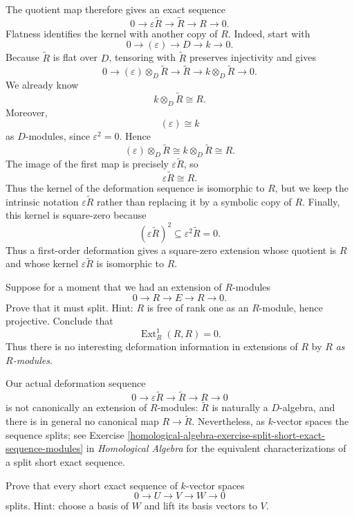 The quotient map therefore gives an exact sequence
$$
0\longrightarrow\varepsilon\widetilde R
\longrightarrow\widetilde R
\longrightarrow R\longrightarrow0.
$$
Flatness identifies the kernel with another copy of $R$. Indeed, start with
$$
0\longrightarrow(\varepsilon)\longrightarrow D
\longrightarrow k\longrightarrow0.
$$
Because $\widetilde R$ is flat over $D$, tensoring with $\widetilde R$ preserves injectivity and gives
$$
0\longrightarrow
(\varepsilon)\otimes_D\widetilde R
\longrightarrow\widetilde R
\longrightarrow k\otimes_D\widetilde R
\longrightarrow0.
$$
We already know
$$
k\otimes_D\widetilde R\cong R.
$$
Moreover,
$$
(\varepsilon)\cong k
$$
as $D$-modules, since $\varepsilon^2=0$. Hence
$$
(\varepsilon)\otimes_D\widetilde R
\cong k\otimes_D\widetilde R
\cong R.
$$
The image of the first map is precisely $\varepsilon\widetilde R$, so
$$
\varepsilon\widetilde R\cong R.
$$
Thus the kernel of the deformation sequence is isomorphic to $R$, but we keep the intrinsic notation $\varepsilon\widetilde R$ rather than replacing it by a symbolic copy of $R$. Finally, this kernel is square-zero because
$$
(\varepsilon\widetilde R)^2
\subseteq\varepsilon^2\widetilde R=0.
$$
Thus a first-order deformation gives a square-zero extension whose quotient is $R$ and whose kernel $\varepsilon\widetilde R$ is isomorphic to $R$.

\begin{exercise}
\label{exercise-module-extension-r-splits}
Suppose for a moment that we had an extension of $R$-modules
$$
0\longrightarrow R\longrightarrow E\longrightarrow R\longrightarrow0.
$$
Prove that it must split. Hint: $R$ is free of rank one as an $R$-module, hence projective. Conclude that
$$
\operatorname{Ext}^1_R(R,R)=0.
$$
Thus there is no interesting deformation information in extensions of $R$ by $R$ \emph{as $R$-modules}.
\end{exercise}

\noindent
Our actual deformation sequence
$$
0\longrightarrow\varepsilon\widetilde R
\longrightarrow\widetilde R
\longrightarrow R\longrightarrow0
$$
is not canonically an extension of $R$-modules: $\widetilde R$ is naturally a $D$-algebra, and there is in general no canonical map $R\to\widetilde R$. Nevertheless, as $k$-vector spaces the sequence splits; see Exercise
\ref{homological-algebra-exercise-split-short-exact-sequence-modules}
in \emph{Homological Algebra} for the equivalent characterizations of a split short exact sequence.

\begin{exercise}
\label{exercise-short-exact-vector-spaces-split}
Prove that every short exact sequence of $k$-vector spaces
$$
0\longrightarrow U\longrightarrow V\longrightarrow W\longrightarrow0
$$
splits. Hint: choose a basis of $W$ and lift its basis vectors to $V$.
\end{exercise}

